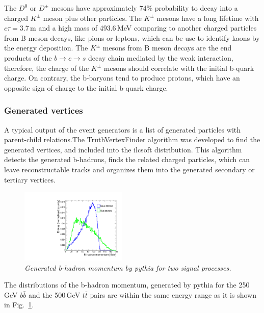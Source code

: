 The $D^0$ or $D^\pm$ mesons have approximately 74\% probability to decay into a charged $K^\pm$ meson plus other particles. The $K^\pm$ mesons have a long lifetime with $c\tau = 3.7$\,m and a high mass of 493.6\,MeV comparing to another charged particles from B meson decays, like pions or leptons, which can be use to identify kaons by the energy deposition. The $K^\pm$ mesons from B meson decays are the end products of the $b\to c\to s$ decay chain mediated by the weak interaction, therefore, the charge of the $K^\pm$ mesons should correlate with the initial b-quark charge. 
On contrary, the b-baryons tend to produce protons, which have an opposite sign of charge to the initial b-quark charge. 

\subsubsection{Generated vertices}
A typical output of the event generators is a list of generated particles with parent-child relations.The TruthVertexFinder algorithm was developed to find the generated vertices, and included into the {\sc ilcsoft} distribution. This algorithm detects the generated b-hadrons, finds the related charged particles, which can leave reconstructable tracks and organizes them into the generated secondary or tertiary vertices.


\begin{figure}[h]
{\centering
    \includegraphics[width=0.45\textwidth]{ILD/plots/gen-hadron-momentum.pdf}
    \caption{\sl Generated b-hadron momentum by {\sc pythia} for two signal processes.}
    \label{fig:GenHadronMomentum_3}
  }
\end{figure}
The distributions of the b-hadron momentum, generated by {\sc pythia} for the 250\,GeV $b\bar{b}$ and the 500\,GeV $t\bar{t}$ pairs are within the same energy range as it is shown in Fig.~\ref{fig:GenHadronMomentum_3}.

